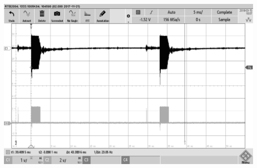 \begin{minipage}{0.5\textwidth}
\includegraphics[width=1\textwidth%
]{Abbildungen/MessungenP2/10V/5m.PNG}
\end{minipage}

